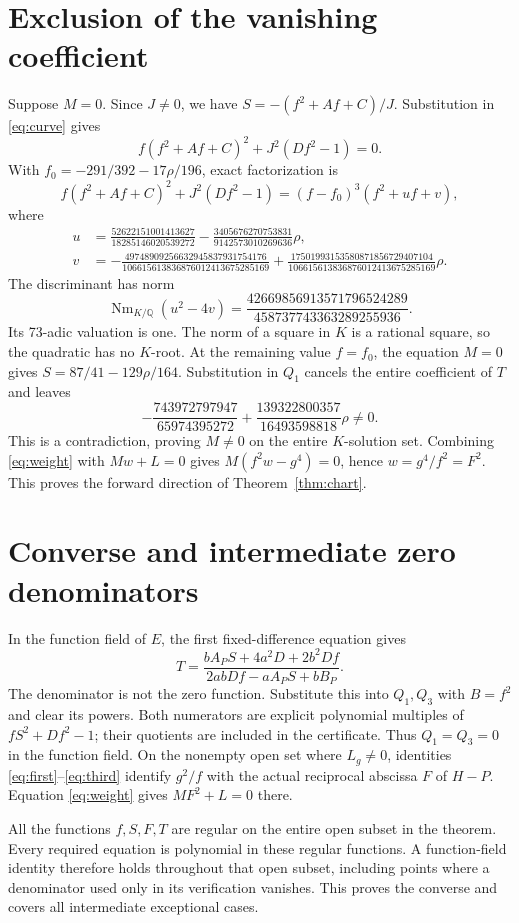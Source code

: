 \documentclass[11pt,a4paper]{article}
\newcommand{\Q}{\mathbb Q}\DeclareMathOperator{\Nm}{Nm}
\begin{document}
\section{Exclusion of the vanishing coefficient}
Suppose $M=0$. Since $J\ne0$, we have
$S=-(f^2+Af+C)/J$. Substitution in \eqref{eq:curve} gives
\[
 f(f^2+Af+C)^2+J^2(Df^2-1)=0.
\]
With $f_0=-291/392-17\rho/196$, exact factorization is
\[
 f(f^2+Af+C)^2+J^2(Df^2-1)=(f-f_0)^3(f^2+uf+v),
\]
where
\begin{align*}
 u&=\frac{52622151001413627}{18285146020539272}
          -\frac{3405676270753831}{9142573010269636}\rho,\\
 v&=-\frac{49748909256632945837931754176}{106615613836876012413675285169}
          +\frac{17501993153580871856729407104}{106615613836876012413675285169}\rho.
\end{align*}
The discriminant has norm
\[
 \Nm_{K/\Q}(u^2-4v)=\frac{42669856913571796524289}{458737743363289255936}.
\]
Its 73-adic valuation is one. The norm of a square in $K$ is a rational
square, so the quadratic has no $K$-root. At the remaining value $f=f_0$,
the equation $M=0$ gives $S=87/41-129\rho/164$. Substitution in $Q_1$
cancels the entire coefficient of $T$ and leaves
\[
 -\frac{743972797947}{65974395272}+\frac{139322800357}{16493598818}\rho\ne0.
\]
This is a contradiction, proving $M\ne0$ on the entire $K$-solution set.
Combining \eqref{eq:weight} with $Mw+L=0$ gives
$M(f^2w-g^4)=0$, hence $w=g^4/f^2=F^2$.
This proves the forward direction of Theorem~\ref{thm:chart}.

\section{Converse and intermediate zero denominators}
In the function field of $E$, the first fixed-difference equation gives
\[
 T=\frac{bA_PS+4a^2D+2b^2Df}{2abDf-aA_PS+bB_P}.
\]
The denominator is not the zero function. Substitute this into $Q_1,Q_3$
with $B=f^2$ and clear its powers. Both numerators are explicit polynomial
multiples of $fS^2+Df^2-1$; their quotients are included in the certificate.
Thus $Q_1=Q_3=0$ in the function field. On the nonempty open set where
$L_g\ne0$, identities \eqref{eq:first}--\eqref{eq:third} identify
$g^2/f$ with the actual reciprocal abscissa $F$ of $H-P$.
Equation \eqref{eq:weight} gives $MF^2+L=0$ there.

All the functions $f,S,F,T$ are regular on the entire open subset in
the theorem. Every required equation is polynomial in these regular
functions. A function-field identity therefore holds throughout that
open subset, including points where a denominator used only in its
verification vanishes. This proves the converse and covers all
intermediate exceptional cases.
\end{document}
